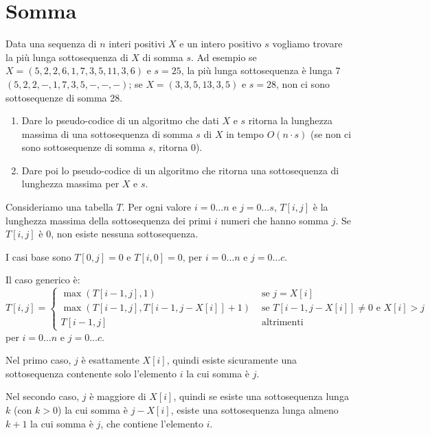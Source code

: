 \clearpage

\section{Somma}

\begin{esercizio}
Data una sequenza di $n$ interi positivi $X$ e un intero positivo $s$ vogliamo trovare la pi\`u lunga sottosequenza di $X$ di somma $s$. Ad esempio se $X = (5,2,2,6,1,7,3,5,11,3,6)$ e $s = 25$, la pi\`u lunga sottosequenza \`e lunga 7 $(5,2,2,-,1,7,3,5,-,-,-)$; se $X = (3,3,5,13,3,5)$ e $s = 28$, non ci sono sottosequenze di somma 28.
\begin{enumerate}
    \item Dare lo pseudo-codice di un algoritmo che dati $X$ e $s$ ritorna la lunghezza massima di una sottosequenza di somma $s$ di $X$ in tempo $O(n \cdot s)$ (se non ci sono sottosequenze di somma $s$, ritorna 0).
    \item Dare poi lo pseudo-codice di un algoritmo che ritorna una sottosequenza di lunghezza massima per $X$ e $s$.
\end{enumerate}
\end{esercizio}

Consideriamo una tabella $T$. Per ogni valore $i = 0 \ldots n$ e $j = 0 \ldots s$, $T[i,j]$ \`e la lunghezza massima della sottosequenza dei primi $i$ numeri che hanno somma $j$. Se $T[i,j]$ \`e 0, non esiste nessuna sottosequenza.

I casi base sono $T[0,j] = 0$ e $T[i,0] = 0$, per $i = 0 \ldots n$ e $j = 0 \ldots c$.

Il caso generico \`e:
\[
T[i,j] = 
\begin{cases}
\max (T[i-1,j], 1) & \text{ se } j = X[i] \\
\max \left( T[i-1,j], T \left[ i-1,j-X[i] \right] + 1 \right) & \text{ se } T \left[ i-1,j-X[i] \right] \neq 0 \text{ e } X[i] > j \\
T[i-1,j] & \text{ altrimenti}
\end{cases}
\]
per $i = 0 \ldots n$ e $j = 0 \ldots c$.

Nel primo caso, $j$ \`e esattamente $X[i]$, quindi esiste sicuramente una sottosequenza contenente solo l'elemento $i$ la cui somma \`e $j$. 

Nel secondo caso, $j$ \`e maggiore di $X[i]$, quindi se esiste una sottosequenza lunga $k$ (con $k > 0$) la cui somma \`e $j - X[i]$, esiste una sottosequenza lunga almeno $k + 1$ la cui somma \`e $j$, che contiene l'elemento $i$.

